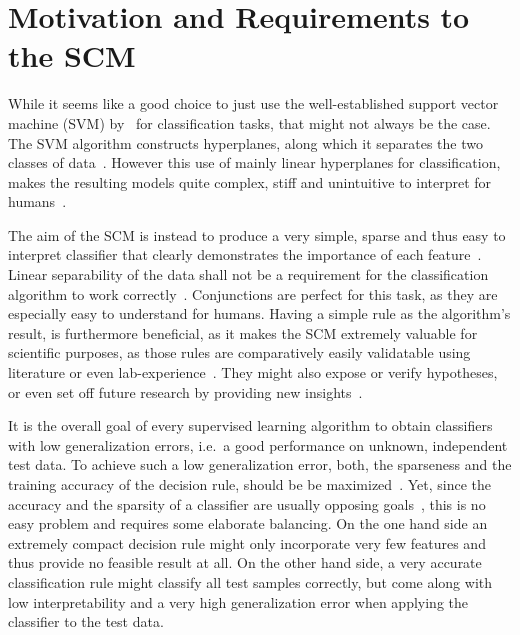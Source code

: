 \section{Motivation and Requirements to the SCM}

While it seems like a good choice to just use the well-established support vector machine (SVM) by~\cite{cortes} for classification tasks, that might not always be the case.
The SVM algorithm constructs hyperplanes, along which it separates the two classes of data~\citep{cristianini}.
However this use of mainly linear hyperplanes for classification, makes the resulting models
quite complex, stiff and unintuitive to interpret for humans~\citep{marchand02}.

The aim of the SCM is instead to produce a very simple, sparse and thus easy to interpret classifier that
clearly demonstrates the importance of each feature~\citep{drouin16}.
Linear separability of the data shall not be a requirement for the classification algorithm to work correctly~\cite{marchand02}.
Conjunctions are perfect for this task, as they are especially easy to understand for humans.
Having a simple rule as the algorithm's result, is furthermore beneficial, as it makes the SCM extremely valuable for scientific purposes,
as those rules are comparatively easily validatable using literature or even lab-experience~\citep{drouin16}.
They might also expose or verify hypotheses, or even set off future research by providing new insights~\citep{kestler11}.

It is the overall goal of every supervised learning algorithm to obtain classifiers with low generalization errors,
i.e.\ a good performance on unknown, independent test data.
To achieve such a low generalization error, both, the sparseness and the training accuracy of the decision rule, should be be maximized~\citep{marchand02}.
Yet, since the accuracy and the sparsity of a classifier are usually opposing goals~\citep{drouin16},
this is no easy problem and requires some elaborate balancing.
On the one hand side an extremely compact decision rule might only incorporate very few features and thus provide no feasible result at all.
On the other hand side, a very accurate classification rule might classify all test samples correctly, but come along with low interpretability and a
very high generalization error when applying the classifier to the test data.

